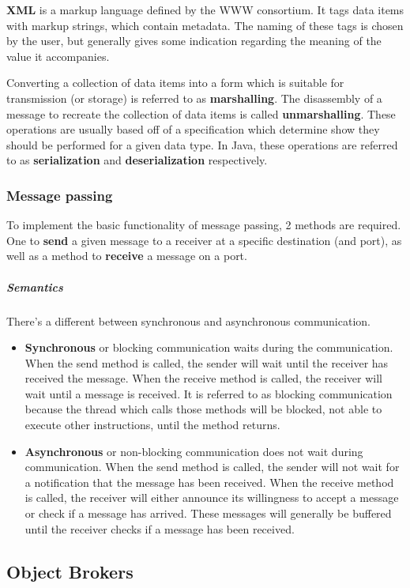 \documentclass[a4paper]{article}
\begin{document}
\textbf{XML} is a markup language defined by the WWW consortium. It tags data items with markup strings, which contain metadata. The naming of these tags is chosen by the user, but generally gives some indication regarding the meaning of the value it accompanies.

Converting a collection of data items into a form which is suitable for transmission (or storage) is referred to as \textbf{marshalling}. The disassembly of a message to recreate the collection of data items is called \textbf{unmarshalling}. These operations are usually based off of a specification which determine show they should be performed for a given data type. In Java, these operations are referred to as \textbf{serialization} and \textbf{deserialization} respectively.

\subsubsection{Message passing}

To implement the basic functionality of message passing, 2 methods are required. One to \textbf{send} a given message to a receiver at a specific destination (and port), as well as a method to \textbf{receive} a message on a port.

\subparagraph{Semantics} There's a different between synchronous and asynchronous communication.

\begin{itemize}
\item \textbf{Synchronous} or blocking communication waits during the communication. When the send method is called, the sender will wait until the receiver has received the message. When the receive method is called, the receiver will wait until a message is received. It is referred to as blocking communication because the thread which calls those methods will be blocked, not able to execute other instructions, until the method returns.
\item \textbf{Asynchronous} or non-blocking communication does not wait during communication. When the send method is called, the sender will not wait for a notification that the message has been received. When the receive method is called, the receiver will either announce its willingness to accept a message or check if a message has arrived. These messages will generally be buffered until the receiver checks if a message has been received.
\end{itemize}

\subsection{Object Brokers}
\end{document}

